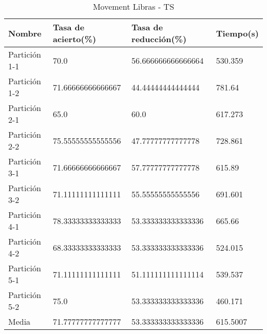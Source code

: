 \begin{table}[H]
	\centering
	\caption{Movement Libras - TS}
	\label{MLIB-TS}
	\begin{tabular}{l|lll}
		Nombre        & Tasa de acierto(\%) & Tasa de reducción(\%) & Tiempo(s) \\ \hline
		Partición 1-1 & 70.0                & 56.666666666666664    & 530.359   \\
		Partición 1-2 & 71.66666666666667   & 44.44444444444444     & 781.64    \\
		Partición 2-1 & 65.0                & 60.0                  & 617.273   \\
		Partición 2-2 & 75.55555555555556   & 47.77777777777778     & 728.861   \\
		Partición 3-1 & 71.66666666666667   & 57.77777777777778     & 615.89    \\
		Partición 3-2 & 71.11111111111111   & 55.55555555555556     & 691.601   \\
		Partición 4-1 & 78.33333333333333   & 53.333333333333336    & 665.66    \\
		Partición 4-2 & 68.33333333333333   & 53.333333333333336    & 524.015   \\
		Partición 5-1 & 71.11111111111111   & 51.111111111111114    & 539.537   \\
		Partición 5-2 & 75.0                & 53.333333333333336    & 460.171   \\ \hline
		Media         & 71.77777777777777   & 53.333333333333336    & 615.5007 
	\end{tabular}
\end{table}